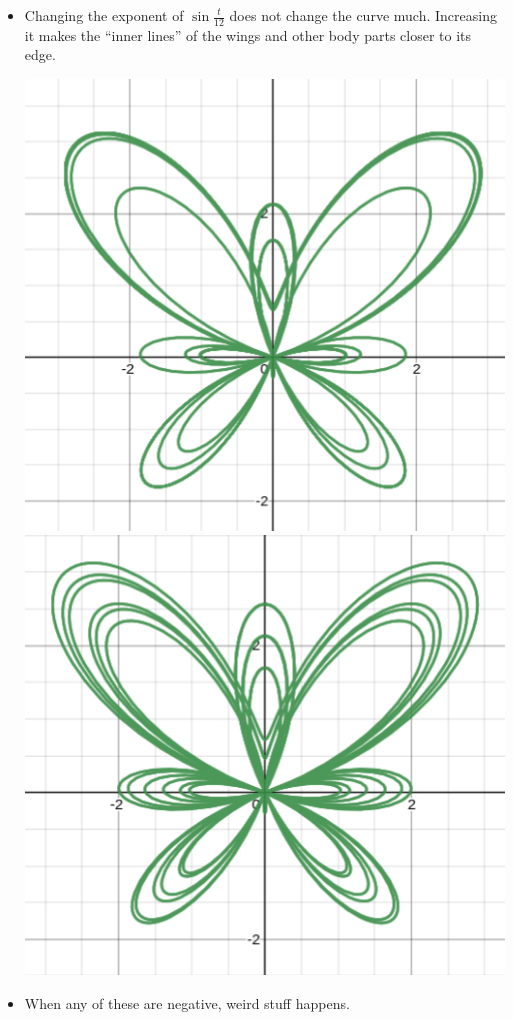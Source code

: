 \documentclass{article}
\begin{document}
\begin{itemize}
\begin{itemize}
	\item Changing the exponent of $\sin\frac{t}{12}$ does not change the curve much. Increasing it makes the ``inner lines'' of the wings and other body parts closer to its edge.

	\begin{center}
		\centering
		\includegraphics*[width=0.45\linewidth]{fig31.png}
		\includegraphics*[width=0.45\linewidth]{fig32.png}
	\end{center}

	\item When any of these are negative, weird stuff happens.
	\end{itemize}


\end{itemize}
\end{document}
